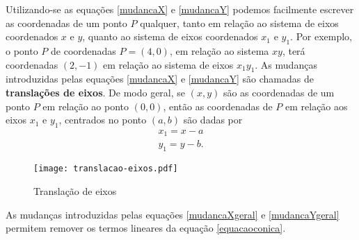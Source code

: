 Utilizando-se as equa\c{c}\~oes \eqref{mudancaX} e \eqref{mudancaY} podemos facilmente escrever as coordenadas de um ponto $P$ qualquer, tanto em rela\c{c}\~ao ao sistema de eixos coordenados $x$ e $y$, quanto ao sistema de eixos coordenados $x_1$ e $y_1$. Por exemplo, o ponto $P$ de coordenadas $P = (4,0)$, em rela\c{c}\~ao ao sistema $xy$, ter\'a coordenadas $(2,-1)$ em rela\c{c}\~ao ao sistema de eixos $x_1y_1$. As mudan\c{c}as introduzidas pelas equa\c{c}\~oes \eqref{mudancaX} e \eqref{mudancaY} s\~ao chamadas de \textbf{transla\c{c}\~oes de eixos}. De modo geral, se $(x,y)$ s\~ao as coordenadas de um ponto $P$ em rela\c{c}\~ao ao ponto $(0,0)$, ent\~ao as coordenadas de $P$ em rela\c{c}\~ao aos eixos $x_1$ e $y_1$, centrados no ponto $(a,b)$ s\~ao dadas por
\begin{align}
  x_1 = x - a\label{mudancaXgeral}\\
  y_1 = y - b\label{mudancaYgeral}.
\end{align}

\begin{figure}[!h]
  \centering
  \caption{Transla\c{c}\~ao de eixos}
  \texttt{[image: translacao-eixos.pdf]}
\end{figure}
As mudan\c{c}as introduzidas pelas equa\c{c}\~oes \eqref{mudancaXgeral} e \eqref{mudancaYgeral} permitem remover os termos lineares da equa\c{c}\~ao \eqref{equacaoconica}.

